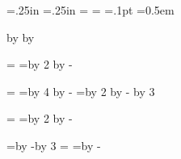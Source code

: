 


\newdimen\totalwidth \newdimen\totalheight
\newdimen\hmargin    \newdimen\vmargin
\newdimen\secskip    \newdimen\lskip
\newdimen\barwidth   \newdimen\barheight
\newdimen\intersecwidth

\totalwidth=11in    %
\totalheight=8.5in  %
\hmargin=.25in      %
\vmargin=.25in      %
\secskip=1pc        %
\lskip=2pt          %
\ifx\pdfoutput\undefined\else   %
  \pdfpagewidth=\totalwidth     %
  \pdfpageheight=\totalheight   %
\fi
\barwidth=.1pt       %
\barheight=2pt       %
\intersecwidth=0.5em %

\newdimen\fullhsize     %
\newdimen\itmwid        %
\newdimen\dfnwid        %
\newdimen\temp          %

\hoffset=-1in \advance \hoffset by \hmargin
\voffset=-1in \advance \voffset by \vmargin

\fullhsize=\totalwidth
\temp=\hmargin \multiply \temp by 2 \advance \fullhsize by -\temp

\hsize=\fullhsize
\temp=\hmargin \multiply \temp by 4 \advance \hsize by -\temp
\temp=\barwidth \multiply \temp by 2 \advance \hsize by -\temp
\divide \hsize by 3

\vsize=\totalheight
\temp=\vmargin \multiply \temp by 2 \advance \vsize by -\temp

\temp=\hsize \advance \temp by -\intersecwidth \divide \temp by 3
\itmwid=\temp
\dfnwid=\hsize \advance \dfnwid by -\itmwid

